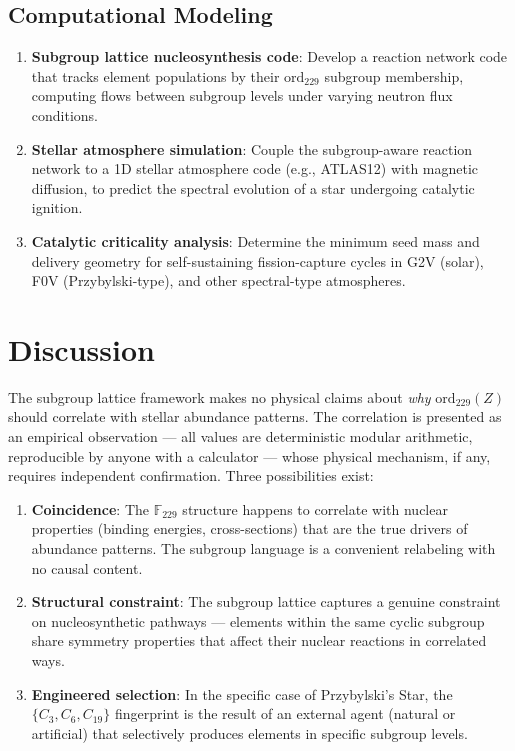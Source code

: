 \subsection{Computational Modeling}

\begin{enumerate}
  \item \textbf{Subgroup lattice nucleosynthesis code}: Develop a reaction network
    code that tracks element populations by their $\text{ord}_{229}$ subgroup
    membership, computing flows between subgroup levels under varying neutron
    flux conditions.

  \item \textbf{Stellar atmosphere simulation}: Couple the subgroup-aware reaction
    network to a 1D stellar atmosphere code (e.g., ATLAS12) with magnetic diffusion,
    to predict the spectral evolution of a star undergoing catalytic ignition.

  \item \textbf{Catalytic criticality analysis}: Determine the minimum seed mass
    and delivery geometry for self-sustaining fission-capture cycles in G2V (solar),
    F0V (Przybylski-type), and other spectral-type atmospheres.
\end{enumerate}


\section{Discussion}
\label{sec:stellar-discussion}

The subgroup lattice framework makes no physical claims about \emph{why}
$\text{ord}_{229}(Z)$ should correlate with stellar abundance patterns. The
correlation is presented as an empirical observation --- all values are deterministic modular arithmetic, reproducible by anyone with a calculator ---
whose physical mechanism, if any, requires independent confirmation.
Three possibilities exist:

\begin{enumerate}
  \item \textbf{Coincidence}: The $\mathbb{F}_{229}$ structure happens to
    correlate with nuclear properties (binding energies, cross-sections) that
    are the true drivers of abundance patterns. The subgroup language is a
    convenient relabeling with no causal content.

  \item \textbf{Structural constraint}: The subgroup lattice captures a genuine
    constraint on nucleosynthetic pathways --- elements within the same cyclic
    subgroup share symmetry properties that affect their nuclear reactions in
    correlated ways.

  \item \textbf{Engineered selection}: In the specific case of Przybylski's Star,
    the $\{C_3, C_6, C_{19}\}$ fingerprint is the result of an external agent
    (natural or artificial) that selectively produces elements in specific subgroup
    levels.
\end{enumerate}

